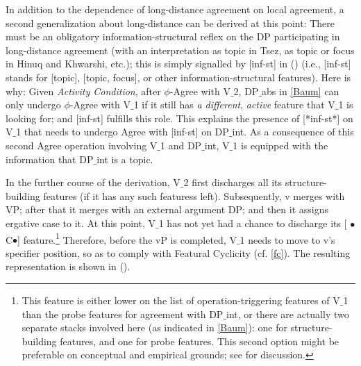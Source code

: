 \documentclass[output=paper
,modfonts
,nonflat]{langsci/langscibook}
\begin{document}
In addition to the dependence of long-distance agreement on local
agreement, a second generalization about long-distance can be derived
at this point: There must be an obligatory information-structural
reflex on the DP participating in long-distance agreement (with an
interpretation as topic in Tsez, as topic or focus in Hinuq and
Khwarshi, etc.); this is simply signalled by [inf-st] in (\Last) (i.e.,
[inf-st] stands for [topic], [topic, focus], or other
information-structural features). Here is why: 
Given   {\itshape Activity Condition}, after $\phi$-Agree
  with V$\_$2, DP$\_${abs} in \ref{Baum} can only undergo $\phi$-Agree
  with V$\_$1 if it still has {\itshape a different}, {\itshape active} feature
  that V$\_$1 is looking for; and [inf-st] fulfills this role.
 This explains the presence of [*inf-st*] on V$\_$1 that needs to undergo
 Agree with [inf-st] on  DP$\_${int}. As a consequence of this second
 Agree operation involving V$\_$1 and DP$\_${int}, V$\_$1 is equipped with the
 information that DP$\_${int} is a topic. 

 In the further course of the derivation, V$\_$2 first discharges all its
 structure-building features (if it has any such featuress
 left). Subsequently, v merges with VP; after that it merges 
 with an external argument DP; and then it assigns ergative case to it. At
 this point, V$\_$1 has not yet had a chance to discharge its [{\small
    $\bullet$}C{\small $\bullet$}] feature.\footnote{This
   feature is either lower on the list of operation-triggering
   features of V$\_$1 than the probe features for agreement with
   DP$\_${int}, or there are actually two separate stacks involved here
   (as indicated in \ref{Baum}):
   one for structure-building features, and one for probe
   features. This second option might be preferable on conceptual and empirical
   grounds; see \cite{Mueller:04:arg,Mueller:09:eao} for discussion.}
  Therefore, before
 the vP is completed, V$\_$1 needs to move to v's specifier position, so
 as to comply with Featural Cyclicity (cf. \ref{fc}). The resulting
 representation is shown in (\Next).
\end{document}
